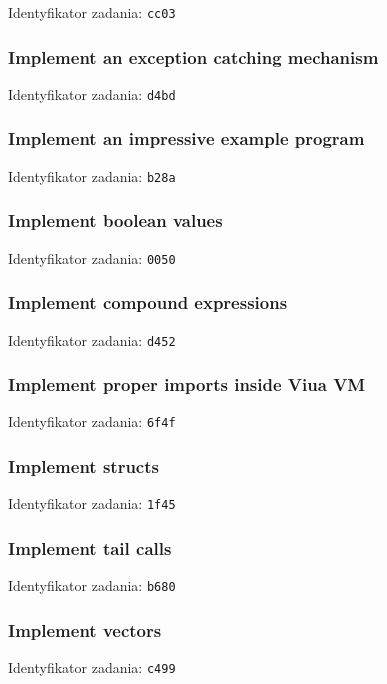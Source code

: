 Identyfikator zadania: \texttt{cc03}

\subsubsection{Implement an exception catching mechanism}

Identyfikator zadania: \texttt{d4bd}

\subsubsection{Implement an impressive example program}

Identyfikator zadania: \texttt{b28a}

\subsubsection{Implement boolean values}

Identyfikator zadania: \texttt{0050}

\subsubsection{Implement compound expressions}

Identyfikator zadania: \texttt{d452}

\subsubsection{Implement proper imports inside Viua VM}

Identyfikator zadania: \texttt{6f4f}

\subsubsection{Implement structs}

Identyfikator zadania: \texttt{1f45}

\subsubsection{Implement tail calls}

Identyfikator zadania: \texttt{b680}

\subsubsection{Implement vectors}

Identyfikator zadania: \texttt{c499}

